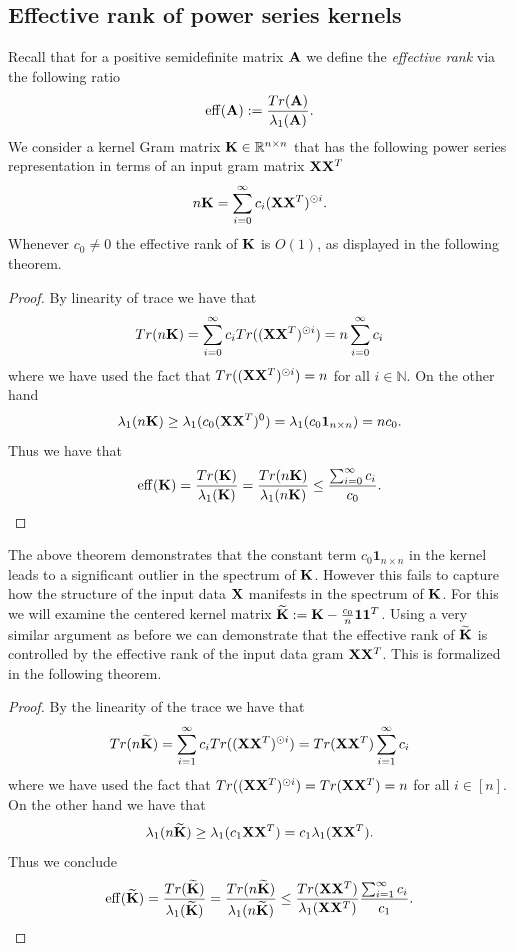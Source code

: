 \subsection{Effective rank of power series kernels}
Recall that for a positive semidefinite matrix $\mathbf{A}$ we define the \textit{effective rank} \cite{DBLP:journals/simods/HuangHV22} via the following ratio
\[ \mathrm{eff}(\mathbf{A}) := \frac{Tr(\mathbf{A})}{\lambda_1(\mathbf{A})}. \]
We consider a kernel Gram matrix $\mathbf{K} \in \mathbb{R}^{n \times n}$ that has the following power series representation in terms of an input gram matrix $\mathbf{X} \mathbf{X}^T$
\[ n \mathbf{K} = \sum_{i = 0}^\infty c_i (\mathbf{X} \mathbf{X}^T)^{\odot i}. \]
Whenever $c_0 \neq 0$ the effective rank of $\mathbf{K}$ is $O(1)$, as displayed in the following theorem.
\infiniteeffectiveconstantbd*
\begin{proof}
By linearity of trace we have that
\[ Tr(n \mathbf{K}) = \sum_{i = 0}^\infty c_i Tr((\mathbf{X} \mathbf{X}^T)^{\odot i}) = n \sum_{i = 0}^\infty c_i \]
where we have used the fact that $Tr((\mathbf{X} \mathbf{X}^T)^{\odot i}) = n$ for all $i \in \mathbb{N}$.  On the other hand
\[ \lambda_1(n \mathbf{K}) \geq \lambda_1(c_0 (\mathbf{X} \mathbf{X}^T)^0) = \lambda_1(c_0 \mathbf{1}_{n \times n}) = n c_0. \]
Thus we have that
\[ \mathrm{eff}(\mathbf{K}) = \frac{Tr(\mathbf{K})}{\lambda_1(\mathbf{K})} = \frac{Tr(n \mathbf{K})}{\lambda_1(n \mathbf{K})} \leq \frac{\sum_{i = 0}^\infty c_i}{c_0}. \]
\end{proof}
The above theorem demonstrates that the constant term $c_0 \mathbf{1}_{n \times n}$ in the kernel leads to a significant outlier in the spectrum of $\mathbf{K}$. However this fails to capture how the structure of the input data $\mathbf{X}$ manifests in the spectrum of $\mathbf{K}$.  For this we will examine the centered kernel matrix $\widetilde{\mathbf{K}} := \mathbf{K} - \frac{c_0}{n} \mathbf{1} \mathbf{1}^T$.  Using a very similar argument as before we can demonstrate that the effective rank of $\widetilde{\mathbf{K}}$ is controlled by the effective rank of the input data gram $\mathbf{X} \mathbf{X}^T$.  This is formalized in the following theorem.
\infiniteeffectiverankbd*
\begin{proof}
By the linearity of the trace we have that
\[ Tr(n \widetilde{\mathbf{K}}) = \sum_{i = 1}^\infty c_i Tr((\mathbf{X} \mathbf{X}^T)^{\odot i}) = Tr(\mathbf{X} \mathbf{X}^T) \sum_{i = 1}^\infty c_i \]
where we have used the fact that $Tr((\mathbf{X} \mathbf{X}^T)^{\odot i}) = Tr(\mathbf{X} \mathbf{X}^T) = n$ for all $i \in [n]$.  On the other hand we have that
\[ \lambda_1(n \widetilde{\mathbf{K}}) \geq \lambda_1(c_1 \mathbf{X} \mathbf{X}^T) = c_1 \lambda_1(\mathbf{X} \mathbf{X}^T). \]
Thus we conclude
\[ \mathrm{eff}(\widetilde{\mathbf{K}}) = \frac{Tr(\widetilde{\mathbf{K}})}{\lambda_1(\widetilde{\mathbf{K}})} = \frac{Tr(n\widetilde{\mathbf{K}})}{\lambda_1(n \widetilde{\mathbf{K}})} \leq \frac{Tr(\mathbf{X} \mathbf{X}^T)}{\lambda_1(\mathbf{X} \mathbf{X}^T)} \frac{\sum_{i = 1}^\infty c_i}{c_1}.  \]
\end{proof}

